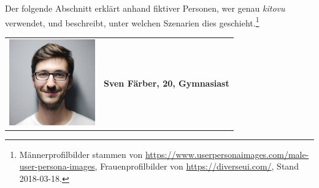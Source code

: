 \documentclass[a4paper]{article}
\begin{document}
Der folgende Abschnitt erklärt anhand fiktiver Personen, wer genau \emph{kitovu} verwendet, und beschreibt, unter welchen Szenarien dies geschieht.\footnote{Männerprofilbilder stammen von \url{https://www.userpersonaimages.com/male-user-persona-images}, Frauenprofilbilder von \url{https://diverseui.com/}, Stand 2018-03-18. }


\begin{tabulary}{\linewidth}{m{10em}l}
		\includegraphics[width=10em]{../../img/userpersonaimages01.png} & \textbf{{\large Sven Färber, 20, Gymnasiast}} \\
\end{tabulary}
\end{document}
